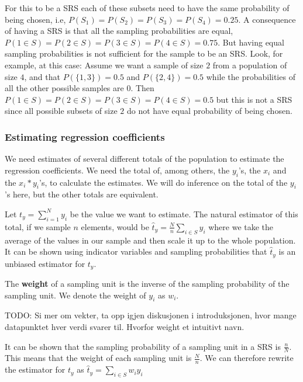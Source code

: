 \documentclass{article}
\begin{document}
For this to be a SRS each of these subsets need to have the same probability of
being chosen, i.e, \(P(S_1) = P(S_2) = P(S_3) = P(S_4) = 0.25\). A consequence of
having a SRS is that all the sampling probabilities are equal, \(P(1 \in S) =
P(2 \in S) = P(3 \in S) = P(4 \in S) = 0.75\). But having equal sampling
probabilities is not sufficient for the sample to be an SRS.
Look, for example, at this case:
Assume we want a sample of size \(2\) from a population of size \(4\), and that
\(P(\{1, 3\}) = 0.5\) and \(P(\{2, 4\}) = 0.5\) while the probabilities of all the
other possible samples are \(0\). Then \(P(1 \in S) = P(2 \in S) = P(3 \in S) = P(4 \in S) = 0.5\)
but this is not a SRS since all possible subsets of size \(2\) do not have equal
probability of being chosen.


\subsubsection{Estimating regression coefficients}

We need estimates of several different totals of the population to estimate the
regression coefficients. We need the total of, among others, the \(y_i\)'s, the
\(x_i\) and the \(x_i * y_i\)'s, to calculate the estimates.
We will do inference on the total of the \(y_i\)'s here, but the other totals
are equivalent.

Let
\(
 t_y = \sum_{i = 1}^{N} y_i
\)
be the value we want to estimate.
The natural estimator of this total, if we sample \(n\) elements, would be
\(
\hat{t}_y = \frac{N}{n}\sum_{i \in S} y_i
\)
where we take the average of the values in our sample and then scale it up to
the whole population.
It can be shown using indicator variables and sampling probabilities that
\(\hat{t}_y\) is an unbiased estimator for \(t_y\).

\begin{definition}
 The \textbf{weight} of a sampling unit is the inverse of the sampling
 probability of the sampling unit. 
 We denote the weight of \(y_i\) as \(w_i\).
\end{definition}

TODO: Si mer om vekter, ta opp igjen diskusjonen i introduksjonen, hvor mange
datapunktet hver verdi svarer til. Hvorfor weight et intuitivt navn.

It can be shown that the sampling probability of a sampling unit in a SRS is
\(\frac{n}{N}\). This means that the weight of each sampling unit is
\(\frac{N}{n}\). We can therefore rewrite the estimator for \(t_y\) as
\(
\hat{t}_y = \sum_{i \in S} w_i y_i
\)
\end{document}
